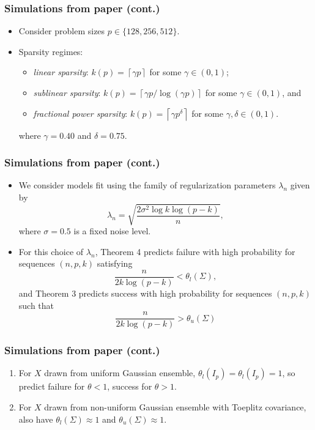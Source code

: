 \documentclass{beamer}
\newcommand{\ceil}[1]{\left\lceil#1\right\rceil}
\begin{document}
\begin{frame}
\frametitle{Simulations from paper (cont.)}

\begin{itemize}
\item Consider problem sizes $p \in \{128, 256, 512\}$.
\item Sparsity regimes:
  \begin{itemize}
  \item \textit{linear sparsity}: $k(p) = \ceil{\gamma p}$ for some
    $\gamma \in (0, 1)$;
  \item \textit{sublinear sparsity}:
    $k(p) = \ceil{\gamma p / \log(\gamma p)}$ for some
    $\gamma \in (0, 1)$, and
  \item \textit{fractional power sparsity}:
    $k(p) = \ceil{\gamma p^\delta}$ for some
    $\gamma, \delta \in (0, 1)$.
  \end{itemize}
  where $\gamma = 0.40$ and $\delta = 0.75$.
\end{itemize}

\end{frame}

\begin{frame}
\frametitle{Simulations from paper (cont.)}

\begin{itemize}
\item We consider models fit using the family of regularization
  parameters $\lambda_n$ given by
  \begin{equation*}
    \lambda_n = \sqrt{\frac{2\sigma^2 \log k \log(p - k)}{n}},
  \end{equation*}
  where $\sigma = 0.5$ is a fixed noise level.

\item For this choice of $\lambda_n$, Theorem 4 predicts failure with
  high probability for sequences $(n, p, k)$ satisfying
  \begin{equation*}
    \frac{n}{2k \log(p - k)} < \theta_l(\Sigma),
  \end{equation*}
  and Theorem 3 predicts success with high probability for sequences
  $(n, p, k)$ such that
  \begin{equation*}
    \frac{n}{2k \log(p - k)} > \theta_u(\Sigma)
  \end{equation*}
\end{itemize}

\end{frame}

\begin{frame}
\frametitle{Simulations from paper (cont.)}

\begin{enumerate}
\item For $X$ drawn from uniform Gaussian ensemble,
  $\theta_l(I_p) = \theta_l(I_p) = 1$, so predict failure for
  $\theta < 1$, success for $\theta > 1$.
\item For $X$ drawn from non-uniform Gaussian ensemble with Toeplitz
  covariance, also have $\theta_l(\Sigma) \approx 1$ and
  $\theta_u(\Sigma) \approx 1$.
\end{enumerate}

\end{frame}
\end{document}
